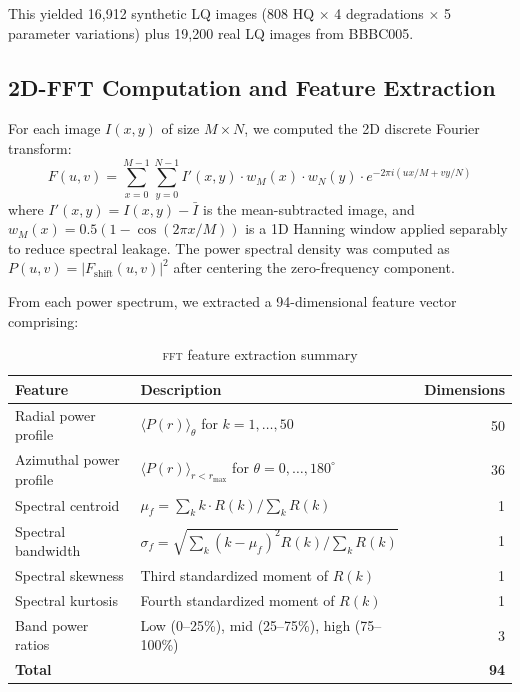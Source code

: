 \documentclass[11pt,a4paper]{article}
\newcommand{\fft}{\textsc{fft}\xspace}
\begin{document}
This yielded 16,912 synthetic LQ images (808 HQ $\times$ 4 degradations
$\times$ 5 parameter variations) plus 19,200 real LQ images from BBBC005.

\subsection{2D-FFT Computation and Feature Extraction}
\label{sec:fft}

For each image $I(x,y)$ of size $M \times N$, we computed the 2D discrete
Fourier transform:
\begin{equation}
    F(u,v) = \sum_{x=0}^{M-1} \sum_{y=0}^{N-1}
    I'(x,y) \cdot w_M(x) \cdot w_N(y) \cdot
    e^{-2\pi i(ux/M + vy/N)}
    \label{eq:dft}
\end{equation}
where $I'(x,y) = I(x,y) - \bar{I}$ is the mean-subtracted image, and
$w_M(x) = 0.5(1 - \cos(2\pi x/M))$ is a 1D Hanning window applied
separably to reduce spectral leakage. The power spectral density was
computed as $P(u,v) = |F_{\text{shift}}(u,v)|^2$ after centering the
zero-frequency component.

From each power spectrum, we extracted a 94-dimensional feature vector
comprising:

\begin{table}[H]
\centering
\caption{\fft feature extraction summary}
\label{tab:fft_features}
\begin{tabular}{@{}llr@{}}
\toprule
\textbf{Feature} & \textbf{Description} & \textbf{Dimensions} \\
\midrule
Radial power profile & $\langle P(r)\rangle_\theta$ for $k=1,\ldots,50$ & 50 \\
Azimuthal power profile & $\langle P(r)\rangle_{r<r_{\max}}$ for $\theta=0,\ldots,180^\circ$ & 36 \\
Spectral centroid & $\mu_f = \sum_k k \cdot R(k) / \sum_k R(k)$ & 1 \\
Spectral bandwidth & $\sigma_f = \sqrt{\sum_k (k-\mu_f)^2 R(k) / \sum_k R(k)}$ & 1 \\
Spectral skewness & Third standardized moment of $R(k)$ & 1 \\
Spectral kurtosis & Fourth standardized moment of $R(k)$ & 1 \\
Band power ratios & Low (0--25\%), mid (25--75\%), high (75--100\%) & 3 \\
\midrule
\textbf{Total} & & \textbf{94} \\
\bottomrule
\end{tabular}
\end{table}
\end{document}
